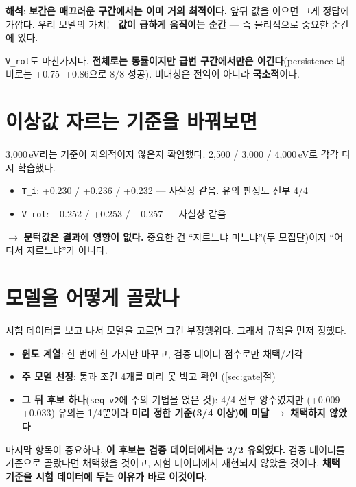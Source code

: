 \documentclass[10pt]{article}
\newcommand{\Ti}{\texttt{T\_i}}
\newcommand{\Vrot}{\texttt{V\_rot}}
\newcommand{\seqv}{\texttt{seq\_v2}}
\begin{document}
\textbf{해석}: \textbf{보간은 매끄러운 구간에서는 이미 거의 최적이다.} 앞뒤 값을 이으면 그게
정답에 가깝다. 우리 모델의 가치는 \textbf{값이 급하게 움직이는 순간} --- 즉 물리적으로
중요한 순간에 있다.

\Vrot 도 마찬가지다. \textbf{전체로는 동률이지만 급변 구간에서만은 이긴다}(persistence
대비로는 +0.75--+0.86으로 8/8 성공). 비대칭은 전역이 아니라 \textbf{국소적}이다.

\section{이상값 자르는 기준을 바꿔보면}
\label{sec:thresh}

3{,}000\,eV라는 기준이 자의적이지 않은지 확인했다. 2{,}500 / 3{,}000 / 4{,}000\,eV로 각각
다시 학습했다.

\begin{itemize}
\item \Ti: +0.230 / +0.236 / +0.232 --- 사실상 같음. 유의 판정도 전부 4/4
\item \Vrot: +0.252 / +0.253 / +0.257 --- 사실상 같음
\end{itemize}

$\rightarrow$ \textbf{문턱값은 결과에 영향이 없다.} 중요한 건 ``자르느냐 마느냐''(두
모집단)이지 ``어디서 자르느냐''가 아니다.

\section{모델을 어떻게 골랐나}

시험 데이터를 보고 나서 모델을 고르면 그건 부정행위다. 그래서 규칙을 먼저 정했다.

\begin{itemize}
\item \textbf{윈도 계열}: 한 번에 한 가지만 바꾸고, 검증 데이터 점수로만 채택/기각
\item \textbf{주 모델 선정}: 통과 조건 4개를 미리 못 박고 확인 (\ref{sec:gate}절)
\item \textbf{그 뒤 후보 하나}(\seqv 에 주의 기법을 얹은 것): 4/4 전부 양수였지만
  (+0.009--+0.033) 유의는 1/4뿐이라 \textbf{미리 정한 기준(3/4 이상)에 미달} $\rightarrow$
  \textbf{채택하지 않았다}
\end{itemize}

마지막 항목이 중요하다. \textbf{이 후보는 검증 데이터에서는 2/2 유의였다.} 검증 데이터를
기준으로 골랐다면 채택했을 것이고, 시험 데이터에서 재현되지 않았을 것이다. \textbf{채택
기준을 시험 데이터에 두는 이유가 바로 이것이다.}
\end{document}
